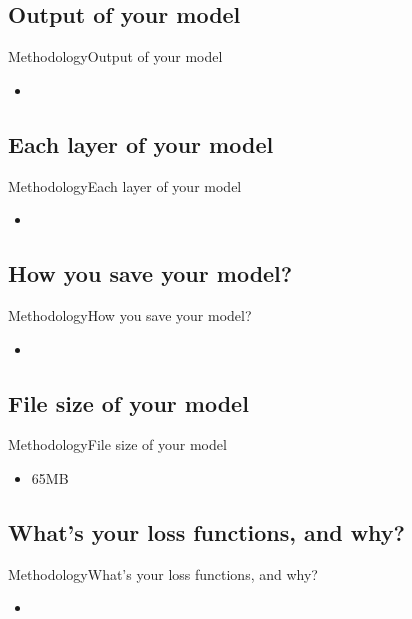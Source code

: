 \documentclass{beamer}
\begin{document}
\begin{CJK*}{UTF8}{bsmi}
\subsection*{Output of your model}
\begin{frame}{Methodology}{Output of your model}
  \begin{itemize}
  \item {
  }
  \end{itemize}
\end{frame}
\subsection*{Each layer of your model}
\begin{frame}{Methodology}{Each layer of your model}
  \begin{itemize}
  \item {
  }
  \end{itemize}
\end{frame}
\subsection*{How you save your model?}
\begin{frame}{Methodology}{How you save your model?}
  \begin{itemize}
  \item {
  }
  \end{itemize}
\end{frame}
\subsection*{File size of your model}
\begin{frame}{Methodology}{File size of your model}
  \begin{itemize}
  \item {
65MB
  }
  \end{itemize}
\end{frame}
\subsection*{What's your loss functions, and why?}
\begin{frame}{Methodology}{What’s your loss functions, and why?}
  \begin{itemize}
  \item {
  }
  \end{itemize}
\end{frame}

\end{CJK*}
\end{document}

